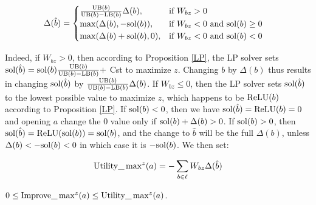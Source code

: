 	\begin{align*}
		&\Delta(\hat{b}) =
		\begin{cases}
			\frac{\mathrm{UB}(b)}{\mathrm{UB}(b)-\mathrm{LB}(b)}\Delta(b),  &\text{if }W_{bz} > 0\\
			\max(\Delta(b),-\mathrm{sol}(b)),  &\text{if }  W_{bz} < 0 \text{ and } \mathrm{sol}(b)\geq0\\
			\max(\Delta(b)+\mathrm{sol}(b),0),  &\text{if }  W_{bz} < 0 \text{ and } \mathrm{sol}(b)<0		 
		\end{cases}
		\end{align*}


Indeed, if $W_{bz}>0$, then according to Proposition \ref{LP}, the LP solver
sets $\mathrm{sol}(\hat{b}) = \mathrm{sol}(b) \frac{\mathrm{UB}(b)}{\mathrm{UB}(b)-\mathrm{LB}(b)} +$ Cst to maximize $z$.
Changing $b$ by $\Delta(b)$ thus results in changing $\mathrm{sol}(\hat{b})$ by 
$\frac{\mathrm{UB}(b)}{\mathrm{UB}(b)-\mathrm{LB}(b)}\Delta(b)$.
If $W_{bz}\leq0$, then the LP solver sets $\mathrm{sol}(\hat{b})$ to the lowest possible value to maximize $z$, which happens to be $\mathrm{ReLU}(b)$ according to Proposition \ref{LP}.
If $\mathrm{sol}(b) < 0$, then we have $\mathrm{sol}(\hat{b})=\mathrm{ReLU}(b)=0$ and opening $a$ change the 0 value only if $\mathrm{sol}(b)+\Delta(b)>0$. If $\mathrm{sol}(b) > 0$, then 
$\mathrm{sol}(\hat{b})=\mathrm{ReLU}(\mathrm{sol}(b))=\mathrm{sol}(b)$, and the change to $\hat{b}$ will be 
the full $\Delta(b)$, unless $\Delta(b) < -\mathrm{sol}(b) < 0$ in which case it is 
$-\mathrm{sol}(b)$. We then set:


$$ \mathrm{Utility}\_\max\nolimits^z(a) = -\sum_{b \in \ell} W_{bz} \Delta(\hat{b})$$
 



\begin{proposition}
	\label{prop2}
		$0 \leq \mathrm{Improve}\_\max^z(a) \leq \mathrm{Utility}\_\max^z(a)$. 
	\end{proposition}
	
